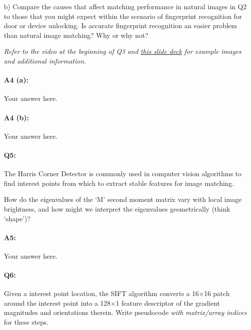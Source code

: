 b) Compare the causes that affect matching performance in natural images in Q2 to those that you might expect within the scenario of fingerprint recognition for door or device unlocking. Is accurate fingerprint recognition an easier problem than natural image matching? Why or why not?

\emph{Refer to the video at the beginning of Q3 and \href{http://biometrics.cse.msu.edu/Presentations/AnilJain_UniquenessOfFingerprints_NAS05.pdf}{this slide deck} for example images and additional information.}

\paragraph{A4 (a):} Your answer here.

\paragraph{A4 (b):} Your answer here.
\pagebreak






\pagebreak
\paragraph{Q5:} 
The Harris Corner Detector is commonly used in computer vision algorithms to find interest points from which to extract stable features for image matching. 

How do the eigenvalues of the `M' second moment matrix vary with local image brightness, and how might we interpret the eigenvalues geometrically (think `shape')?

\paragraph{A5:} Your answer here.







\pagebreak
\paragraph{Q6:} Given a interest point location, the SIFT algorithm converts a 16$\times$16 patch around the interest point into a 128$\times$1 feature descriptor of the gradient magnitudes and orientations therein. Write pseudocode \emph{with matrix/array indices} for these steps.

